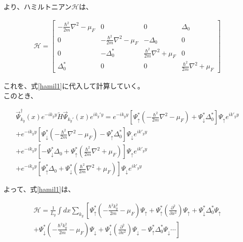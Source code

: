 \documentclass{jsarticle}
\begin{document}
		より、ハミルトニアン$\mathcal{H}$は、
		
		\begin{align}
			\mathcal{H}=
			\begin{bmatrix}
				-\frac{\hbar^2}{2m}\nabla^2-\mu_F & 0 & 0 & \Delta_0 \\ 
				0 & -\frac{\hbar^2}{2m}\nabla^2-\mu_F & -\Delta_0 & 0 \\ 
				0 & -\Delta_0^\ast & \frac{\hbar^2}{2m}\nabla^2+\mu_F & 0 \\ 
				\Delta_0^\ast & 0 & 0 & \frac{\hbar^2}{2m}\nabla^2+\mu_F
			\end{bmatrix} 
		\end{align}
		
		これを、式\eqref{hamil1}に代入して計算していく。　\\
		このとき、
		
		\begin{align}
			\vec{\Psi}_{k_y}^\dagger(x) e^{-ik_yy} \tilde{H}  \vec{\Psi}_{k_y'}(x) e^{ik_y'y} = 
			e^{-ik_yy} \left[ \Psi_\uparrow^\ast \left( -\frac{\hbar^2}{2m}\nabla^2-\mu_F \right) +\Psi_\downarrow^\ast \Delta_0^\ast \right] \Psi_\uparrow e^{ik'_yy} \nonumber\\
			+e^{-ik_yy} \left[ \Psi_\downarrow^\ast \left( -\frac{\hbar^2}{2m}\nabla^2-\mu_F \right) -\Psi_\uparrow^\ast \Delta_0^\ast \right] \Psi_\downarrow e^{ik'_yy} \nonumber\\
			+ e^{-ik_yy} \left[ -\Psi_\downarrow^\ast\Delta_0 +\Psi_\uparrow^\ast \left( \frac{\hbar^2}{2m}\nabla^2+\mu_F \right) \right] \Psi_\uparrow e^{ik'_yy} \nonumber\\
			+e^{-ik_yy} \left[ \Psi_\uparrow^\ast\Delta_0 +\Psi_\downarrow^\ast \left( \frac{\hbar^2}{2m}\nabla^2+\mu_F \right) \right] \Psi_\downarrow e^{ik'_yy}
		\end{align}
		
		よって、式\eqref{hamil1}は、
		
		\begin{align}
			\mathcal{H}= \frac{1}{L_y}\int dx \sum_{k_y}
			\left[ \Psi_\uparrow^\ast \left( -\frac{\hbar^2k_y^2}{2m}-\mu_F \right)\Psi_\uparrow
			+\Psi_\uparrow^\ast \left( \frac{\partial^2}{\partial x^2}\right)\Psi_\uparrow
			+\Psi_\downarrow^\ast \Delta_0^\ast \Psi_\uparrow \right. \nonumber \\ \left.+
			\Psi_\downarrow^\ast \left( -\frac{\hbar^2k_y^2}{2m}-\mu_F \right)\Psi_\downarrow
			+\Psi_\downarrow^\ast \left( \frac{\partial^2}{\partial x^2} \right) \Psi_\downarrow
			-\Psi_\uparrow^\ast \Delta_0^\ast \Psi_\downarrow \cdots
			\right] 
			\label{hamil2}
		\end{align}
		
\end{document}
